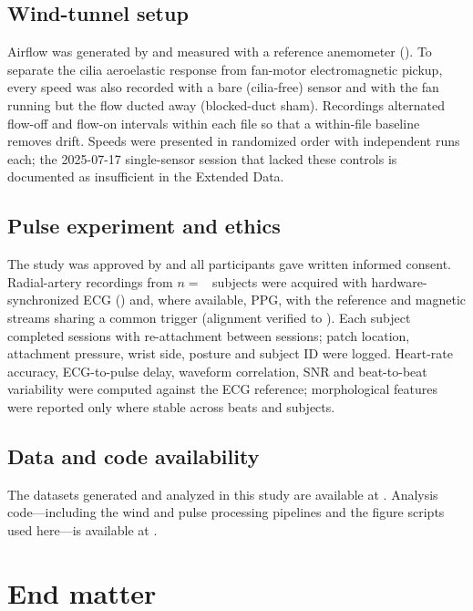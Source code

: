 \subsection*{Wind-tunnel setup}
Airflow was generated by  and measured with a
reference anemometer (). To separate the cilia
aeroelastic response from fan-motor electromagnetic pickup, every speed was
also recorded with a bare (cilia-free) sensor and with the fan running but
the flow ducted away (blocked-duct sham). Recordings alternated flow-off and
flow-on intervals within each file so that a within-file baseline removes
drift. Speeds  were presented in
randomized order with  independent runs each; the
2025-07-17 single-sensor session that lacked these controls is documented as
insufficient in the Extended Data.

\subsection*{Pulse experiment and ethics}
The study was approved by  and
all participants gave written informed consent. Radial-artery recordings
from $n=$~ subjects were acquired with
hardware-synchronized ECG () and, where available, PPG,
with the reference and magnetic streams sharing a common trigger (alignment
verified to ). Each subject completed 
sessions with re-attachment between sessions; patch location, attachment
pressure, wrist side, posture and subject ID were logged. Heart-rate
accuracy, ECG-to-pulse delay, waveform correlation, SNR and beat-to-beat
variability were computed against the ECG reference; morphological features
were reported only where stable across beats and subjects.

\subsection*{Data and code availability}
The datasets generated and analyzed in this study are available at
. Analysis code---including the wind and pulse
processing pipelines and the figure scripts used here---is available at
.

\section*{End matter}

